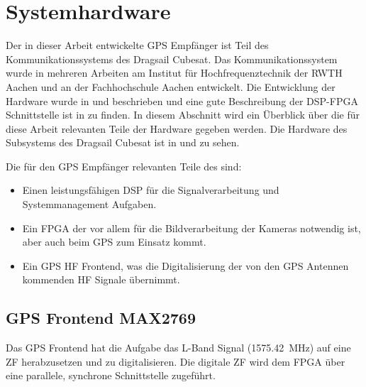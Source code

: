 \section{Systemhardware}
Der in dieser Arbeit entwickelte GPS Empfänger ist Teil des Kommunikationssystems des Dragsail Cubesat. Das Kommunikationssystem wurde in mehreren Arbeiten am Institut für Hochfrequenztechnik der RWTH Aachen und an der Fachhochschule Aachen entwickelt. Die Entwicklung der \comboard Hardware wurde in \cite{DragsailKaiMA} und \cite{DragsailMattiMA} beschrieben und eine gute Beschreibung der DSP-FPGA Schnittstelle ist in \cite{DragsailAndrejMA} zu finden.
In diesem Abschnitt wird ein Überblick über die für diese Arbeit relevanten Teile der \comboard Hardware gegeben werden. Die Hardware des \comboard Subsystems des Dragsail Cubesat ist in  und  zu sehen. 

Die für den GPS Empfänger relevanten Teile des \comboard sind: 
\begin{itemize}
\item Einen leistungsfähigen \gls{DSP} für die Signalverarbeitung und Systemmanagement Aufgaben.
\item Ein \gls{FPGA} der vor allem für die Bildverarbeitung der Kameras notwendig ist, aber auch beim GPS zum Einsatz kommt.
\item Ein GPS HF Frontend, was die Digitalisierung der von den GPS Antennen kommenden HF Signale übernimmt.
\end{itemize}




\subsection{GPS Frontend MAX2769}
Das GPS Frontend hat die Aufgabe das L-Band Signal (\SI{1575.42}{\MHz}) auf eine \gls{ZF} herabzusetzen und zu digitalisieren. Die digitale ZF wird dem FPGA über eine parallele, synchrone Schnittstelle zugeführt. 



